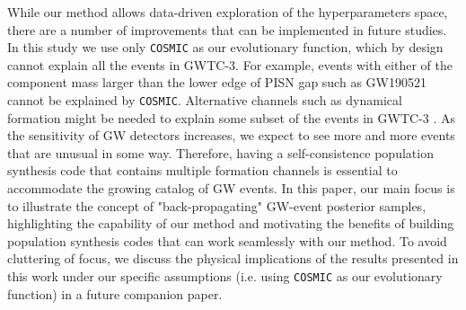 \documentclass[linenumbers,twocolumn]{aastex631}
\begin{document}
While our method allows data-driven exploration of the hyperparameters space, there are a number of improvements that can be implemented in future studies.
In this study we use only \texttt{COSMIC} as our evolutionary function, which by design cannot explain all the events in GWTC-3.
For example, events with either of the component mass larger than the lower edge of PISN gap such as GW190521 cannot be explained by \texttt{COSMIC}.
Alternative channels such as dynamical formation might be needed to explain some subset of the events in GWTC-3 \citep{Zevin2021}.
As the sensitivity of GW detectors increases, we expect to see more and more events that are unusual in some way.
Therefore, having a self-consistence population synthesis code that contains multiple formation channels is essential to accommodate the growing catalog of GW events.
In this paper, our main focus is to illustrate the concept of "back-propagating" GW-event posterior samples,
highlighting the capability of our method and motivating the benefits of building population synthesis codes that can work seamlessly with our method.
To avoid cluttering of focus, we discuss the physical implications of the results presented in this work under our specific assumptions (i.e. using \texttt{COSMIC} as our evolutionary function) in a future companion paper.
\end{document}
